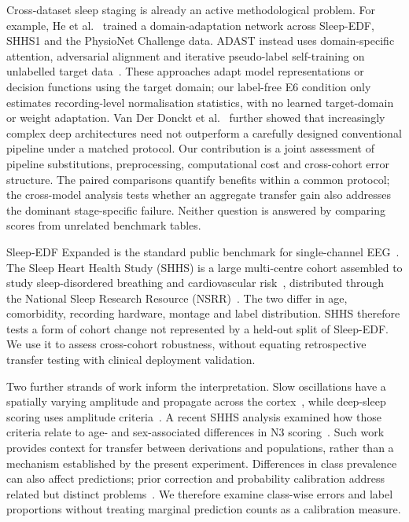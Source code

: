\documentclass[11pt,a4paper]{article}
\begin{document}
Cross-dataset sleep staging is already an active methodological problem. For example, He et
al.~\cite{he2023crossscenario} trained a domain-adaptation network across Sleep-EDF, SHHS1 and the
PhysioNet Challenge data. ADAST instead uses domain-specific attention, adversarial alignment and
iterative pseudo-label self-training on unlabelled target data~\cite{eldele2023adast}. These approaches
adapt model representations or decision functions using the target domain; our label-free E6 condition
only estimates recording-level normalisation statistics, with no learned target-domain or weight adaptation.
Van Der Donckt et al.~\cite{vdd2023traditional} further showed that increasingly complex deep
architectures need not outperform a carefully designed conventional pipeline under a matched protocol.
Our contribution is a joint assessment of pipeline substitutions, preprocessing, computational cost
and cross-cohort error structure. The paired comparisons quantify benefits within a common protocol;
the cross-model analysis tests whether an aggregate transfer gain also addresses the dominant stage-specific
failure. Neither question is answered by comparing scores from unrelated benchmark tables.

Sleep-EDF Expanded is the standard public benchmark for single-channel
EEG~\cite{kemp2000sleepEDF,physionetSleepEDF}. The Sleep Heart Health Study (SHHS) is a large
multi-centre cohort assembled to study sleep-disordered breathing and cardiovascular
risk~\cite{quan1997shhs}, distributed through the National Sleep Research Resource
(NSRR)~\cite{zhang2018nsrr}. The two differ in age, comorbidity, recording hardware, montage and label
distribution. SHHS therefore tests a form of cohort change not represented by a held-out split of
Sleep-EDF. We use it to assess cross-cohort robustness, without equating retrospective transfer testing
with clinical deployment validation.

Two further strands of work inform the interpretation. Slow oscillations have a spatially varying
amplitude and propagate across the cortex~\cite{massimini2004travelling}, while deep-sleep scoring uses
amplitude criteria~\cite{rechtschaffen1968,berry2017aasm}. A recent SHHS analysis examined how those
criteria relate to age- and sex-associated differences in N3 scoring~\cite{davidson2025n3}. Such work
provides context for transfer between derivations and populations, rather than a mechanism established
by the present experiment. Differences in class prevalence can also affect predictions; prior correction
and probability calibration address related but distinct problems~\cite{saerens2002adjusting,guo2017calibration}.
We therefore examine class-wise errors and label proportions without treating marginal prediction
counts as a calibration measure.
\end{document}

